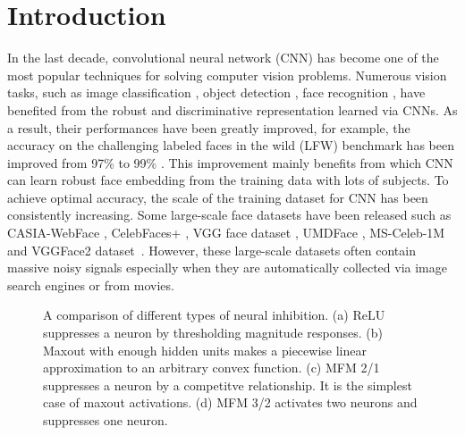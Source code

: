 \documentclass[journal,transmag]{IEEEtran}
\begin{document}
\maketitle


\IEEEdisplaynontitleabstractindextext







\IEEEpeerreviewmaketitle



\section{Introduction}


In the last decade, convolutional neural network (CNN) has become one of the most popular techniques for solving computer vision problems. Numerous vision tasks, such as image classification \cite{HeZRS16}, object detection \cite{DBLP:journals/corr/RedmonDGF15}, face recognition \cite{DBLP:conf/icb/LeiCHLL07, sun2014deep, taigman2014deepface, yi2014learning}, have benefited from the robust and discriminative representation learned via CNNs. As a result, their performances have been greatly improved, for example, the accuracy on the challenging labeled faces in the wild (LFW) benchmark has been improved from 97\% \cite{taigman2014deepface} to 99\% \cite{parkhi2015deep, schroff2015facenet, sun2014deep}. This improvement mainly benefits from which CNN can learn robust face embedding from the training data with lots of subjects. To achieve optimal accuracy, the scale of the training dataset for CNN has been consistently increasing. Some large-scale face datasets have been released such as CASIA-WebFace \cite{yi2014learning}, CelebFaces+ \cite{sun2014deep}, VGG face dataset \cite{parkhi2015deep}, UMDFace \cite{bansal2016umdfaces,bansal2017s}, MS-Celeb-1M \cite{DBLP:journals/corr/GuoZHHG16} and VGGFace2 dataset~\cite{DBLP:journals/corr/abs-1710-08092}. However, these large-scale datasets often contain massive noisy signals especially when they are automatically collected via image search engines or from movies.

\begin{figure}
\centering
{}\hspace{0.2cm}
\caption{A comparison of different types of neural inhibition. (a) ReLU suppresses a neuron by thresholding magnitude responses. (b) Maxout with enough hidden units makes a piecewise linear approximation to an arbitrary convex function. (c) MFM 2/1 suppresses a neuron by a competitve relationship. It is the simplest case of maxout activations. (d) MFM 3/2 activates two neurons and suppresses one neuron.}
\label{fig:activation}
\end{figure}
\end{document}

